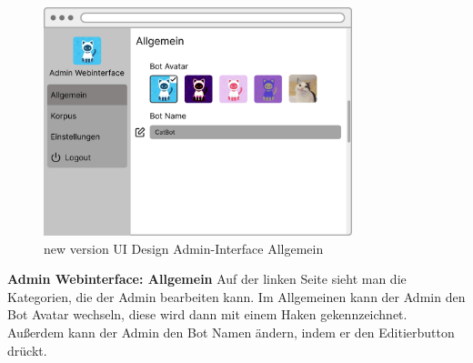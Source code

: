 \begin{figure}[H]
    \centering
    \includegraphics[width=0.8\textwidth]{bilder/new vers. UI Design/Allgemein/Allgemein.png}
    \caption{new version UI Design Admin-Interface Allgemein}
    \label{fig:new version UI Design Admin-Interface Allgemein}
    \end{figure}
\noindent \textbf{Admin Webinterface: Allgemein} \newline
Auf der linken Seite sieht man die Kategorien, die der Admin bearbeiten kann. Im Allgemeinen kann
der Admin den Bot Avatar wechseln, diese wird dann mit einem Haken gekennzeichnet. Außerdem kann
der Admin den Bot Namen ändern, indem er den Editierbutton drückt.

